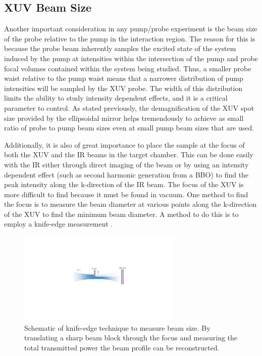 \subsection{XUV Beam Size}
\label{sec:xuv_beam_size_knife_edge}

Another important consideration in any pump/probe experiment is the beam size of the probe relative to the pump in the interaction region.  The reason for this is because the probe beam inherently samples the excited state of the system induced by the pump at intensities within the intersection of the pump and probe focal volumes contained within the system being studied.  Thus, a smaller probe waist relative to the pump waist means that a narrower distribution of pump intensities will be sampled by the XUV probe.  The width of this distribution limits the ability to study intensity dependent effects, and it is a critical parameter to control. As stated previously, the demagnification of the XUV spot size provided by the ellipsoidal mirror helps tremendously to achieve as small ratio of probe to pump beam sizes even at small pump beam sizes that are used.

Additionally, it is also of great importance to place the sample at the focus of both the XUV and the IR beams in the target chamber.  This can be done easily with the IR either through direct imaging of the beam or by using an intensity dependent effect (such as second harmonic generation from a BBO) to find the peak intensity along the k-direction of the IR beam.  The focus of the XUV is more difficult to find because it must be found in vacuum.  One method to find the focus is to measure the beam diameter at various points along the k-direction of the XUV to find the minimum beam diameter.  A method to do this is to employ a knife-edge measurement \cite{arnaudTechniqueFastMeasurement1971, skinnerMeasurementRadiusHighpower1972,marshallTwoMethodsMeasuring2010,almeidaHarmonicsBeamsCharacterization2016}.

\begin{figure}
	\centering
	\includegraphics[width=0.7\textwidth]{figures/Beamline/knife_edge_xuv.pdf}
	\caption[Schematic of knife-edge technique to measure beam size]{Schematic of knife-edge technique to measure beam size. By translating a sharp beam block through the focus and measuring the total transmitted power the beam profile can be reconstructed.}
	\label{fig:knife_edge_beam_size_measurement}
\end{figure}

